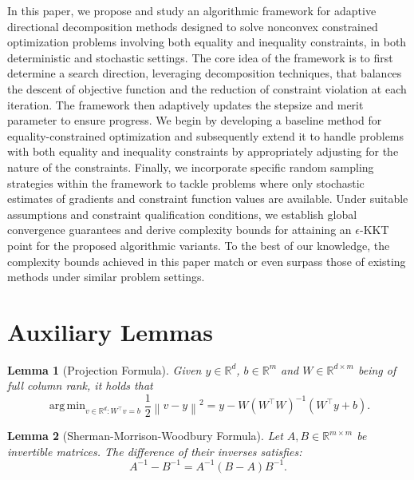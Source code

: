 \documentclass[11pt]{article}
\newcommand{\R}{\mathbb{R}}
\newcommand{\norm}[1]{\left \lVert #1 \right \rVert}
\newcommand{\argmin}{\mathop{\mathrm{arg\,min}}}
\newtheorem{lemma}{Lemma}
\begin{document}
In this paper, we propose and study an algorithmic framework for adaptive directional decomposition methods designed to solve nonconvex constrained optimization problems involving both equality and inequality constraints, in both deterministic and stochastic settings. The core idea of the framework is to first determine a search direction, leveraging decomposition techniques, that balances the descent of objective function and the  reduction of constraint violation at each iteration. The framework then adaptively updates the stepsize and merit parameter to ensure progress. We begin by developing a baseline method for equality-constrained optimization and subsequently extend it to handle problems with both equality and inequality constraints by appropriately adjusting for the nature of the constraints. Finally, we incorporate specific random sampling strategies within the framework to tackle problems where only stochastic estimates of gradients and constraint function values are available. Under suitable assumptions and constraint qualification conditions, we establish global convergence guarantees and derive complexity bounds for attaining an $\epsilon$-KKT point for the proposed algorithmic variants. To the best of our knowledge, the complexity bounds achieved in this paper match or even surpass those of existing methods under similar problem settings.




\appendix

\renewcommand{\thelemma}{\thesection.\arabic{lemma}}
\setcounter{lemma}{0}
\section{Auxiliary Lemmas}
\begin{lemma}[Projection Formula]\label{lm:aff_proj}
  Given $y \in \R^d$, $b \in \R^m$ and $W \in \R^{d \times m}$ being of full column rank, it holds that
    \begin{equation*}
    \argmin_{v \in \R^d : W^{\top} v = b} \frac{1}{2} \norm{ v - y}^2 = y - W(W^{\top} W)^{-1} (W^{\top} y + b).
  \end{equation*} 
\end{lemma}

\begin{lemma}[Sherman-Morrison-Woodbury Formula]\label{lm:smw}
Let \( A, B \in\R^{m\times m} \) be invertible matrices. The difference of their inverses satisfies:
\[
A^{-1} - B^{-1} = A^{-1} (B - A) B^{-1}.
\]
\end{lemma}
\end{document}
